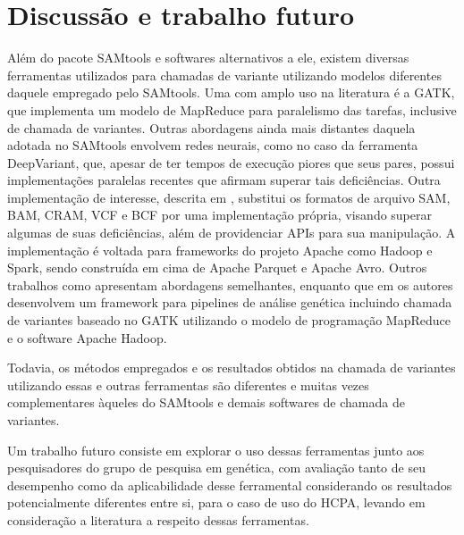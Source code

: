 \documentclass[cic,tc]{iiufrgs}
\begin{document}
\section{Discussão e trabalho futuro}

Além do pacote SAMtools e softwares alternativos a ele, existem diversas
ferramentas utilizados para chamadas de variante utilizando modelos diferentes
daquele empregado pelo SAMtools. Uma com amplo uso na
literatura\cite{de2017gatk} é a GATK\cite{mckenna2010genome}, que implementa um
modelo de MapReduce para paralelismo das tarefas, inclusive de chamada de
variantes. Outras abordagens ainda mais distantes daquela adotada no SAMtools
envolvem redes neurais, como no caso da ferramenta
DeepVariant,\cite{poplin2018universal} que, apesar de ter tempos de execução
piores que seus pares, possui implementações paralelas recentes que afirmam
superar tais deficiências.\cite{ahmad2021vc} Outra implementação de interesse,
descrita em \cite{massie2013adam}, substitui os formatos de arquivo SAM, BAM,
CRAM, VCF e BCF por uma implementação própria, visando superar algumas de suas
deficiências, além de providenciar APIs para sua manipulação. A implementação é
voltada para frameworks do projeto Apache como Hadoop e Spark, sendo construída
em cima de Apache Parquet e Apache Avro.  Outros trabalhos como
\cite{boufea2017managing} apresentam abordagens semelhantes, enquanto que em
\cite{decap2015halvade} os autores desenvolvem um framework para pipelines de
análise genética incluindo chamada de variantes baseado no GATK utilizando o
modelo de programação MapReduce e o software Apache Hadoop.

Todavia, os métodos empregados e os resultados obtidos na chamada de variantes
utilizando essas e outras ferramentas são diferentes e muitas vezes
complementares àqueles do SAMtools e demais softwares de chamada de
variantes.\cite{gezsi2015variantmetacaller}\cite{guo2015seqmule}

Um trabalho futuro consiste em explorar o uso dessas ferramentas junto aos
pesquisadores do grupo de pesquisa em genética, com avaliação tanto de seu
desempenho como da aplicabilidade desse ferramental considerando os resultados
potencialmente diferentes entre si, para o caso de uso do HCPA, levando em
consideração a literatura a respeito dessas ferramentas.



\end{document}
